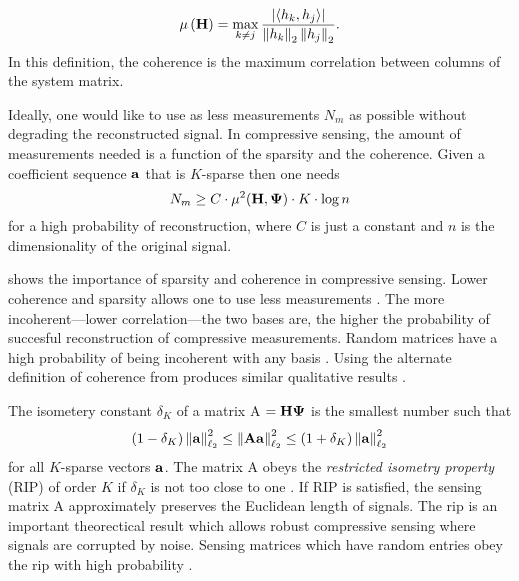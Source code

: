 \begin{equation}
	\mu \left( \mathbf{H} \right) =  \max_{k \neq j } \frac{ | \langle h_k, h_j \rangle | } { \left\| h_k \right\|_2 \left\| h_j \right\|_2 }.
	\label{eq:coherenceDef2}
\end{equation}
In this definition, the coherence is the maximum correlation between columns of the system matrix. 

Ideally, one would like to use as less measurements $N_m$ as possible without degrading the reconstructed signal. In \gls{compressive sensing}, the amount of measurements needed is a function of the sparsity and the coherence. Given a coefficient sequence $\mathbf{a}$ that is $K$-sparse then one needs
\begin{equation}
N_m \geq C \cdot \mu^2 ( \mathbf{H} , \mathbf{\Psi} ) \cdot K \cdot \log n
\label{eq:minMeas1}
\end{equation}
for a high probability of reconstruction, where $C$ is just a constant and $n$ is the dimensionality of the original signal.

 shows the importance of sparsity and coherence in compressive sensing. Lower coherence and sparsity allows one to use less measurements \cite{duarte2008single}. The more incoherent---lower correlation---the two bases are, the higher the probability of succesful reconstruction of compressive measurements. Random matrices have a high probability of being incoherent with any basis \cite{candes2008introduction}. Using the alternate definition of coherence from  produces similar qualitative results \cite{tropp2006just}. 

The isometery constant $\delta_K$ of a matrix \gls{A} $=\mathbf{H}\mathbf{\Psi}$ is the smallest number such that 
\begin{equation}
\left( 1 - \delta_K \right) \left\| \mathbf{a} \right\|_{\ell_2}^{2} \leq \left\| \mathbf{A} \mathbf{a} \right\|_{\ell_2}^{2} \leq \left( 1 + \delta_K \right) \left\| \mathbf{a} \right\|_{\ell_2}^{2} 
\end{equation}
for all $K$-sparse vectors $\mathbf{a}$. The matrix \gls{A} obeys the \emph{restricted isometry property} (RIP) of order $K$ if $\delta_K$ is not too close to one \cite{candes2008introduction}. If RIP is satisfied, the sensing matrix \gls{A} approximately preserves the Euclidean length of signals. The \gls{rip} is an important theorectical result which allows robust compressive sensing where signals are corrupted by noise. Sensing matrices which have random entries obey the \gls{rip} with high probability \cite{candes2008introduction, duarte2008single, foucart2013mathematical}. 

